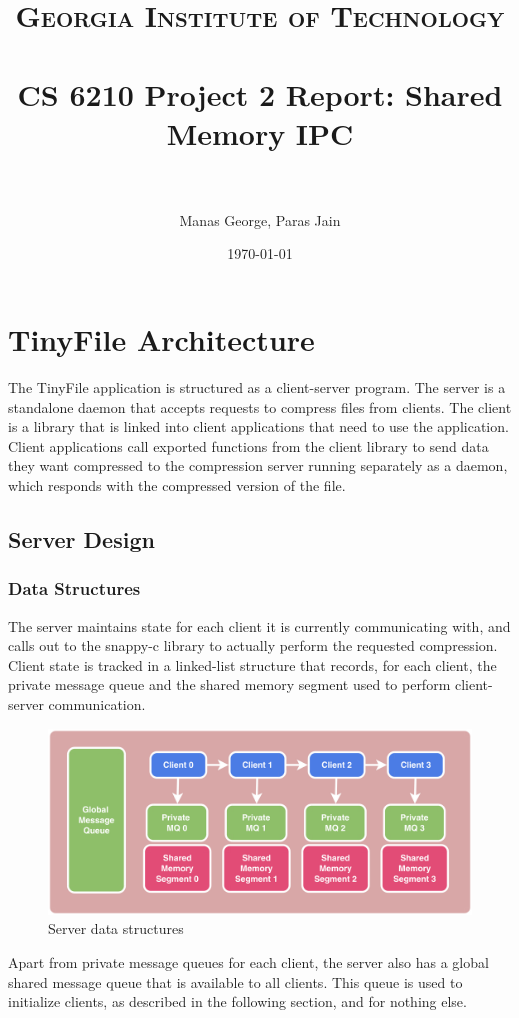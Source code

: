 \documentclass[paper=a4, fontsize=11pt]{scrartcl} %
\title{	
\normalfont \normalsize 
\textsc{Georgia Institute of Technology} \\ [25pt] %
\horrule{0.5pt} \\[0.4cm] %
\huge CS 6210 Project 2 Report: Shared Memory IPC \\ %
\horrule{2pt} \\[0.5cm] %
}
\author{Manas George, Paras Jain} %
\date{\normalsize\today} %
\numberwithin{equation}{section} %
\numberwithin{figure}{section} %
\numberwithin{table}{section} %
\begin{document}
\maketitle %

\section{TinyFile Architecture}
The TinyFile application is structured as a client-server program. The server is a standalone daemon that accepts requests to compress files from clients. The client is a library that is linked into client applications that need to use the application. Client applications call exported functions from the client library to send data they want compressed to the compression server running separately as a daemon, which responds with the compressed version of the file.
\subsection{Server Design}
\subsubsection{Data Structures}
The server maintains state for each client it is currently communicating with, and calls out to the snappy-c library to actually perform the requested compression. Client state is tracked in a linked-list structure that records, for each client, the private message queue and the shared memory segment used to perform client-server communication.

\begin{figure}
  \includegraphics[width=\linewidth]{img/ll.png}
  \caption{Server data structures}
\end{figure}

Apart from private message queues for each client, the server also has a global shared message queue that is available to all clients. This queue is used to initialize clients, as described in the following section, and for nothing else.
\end{document}

